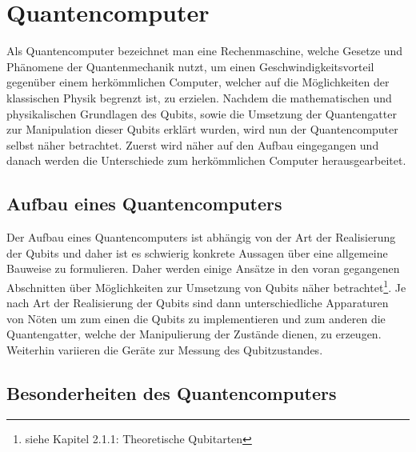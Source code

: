 \documentclass[12pt]{report}
\begin{document}
\chapter{Quantencomputer}			%

Als Quantencomputer bezeichnet man eine  Rechenmaschine, welche Gesetze und Phänomene der Quantenmechanik nutzt, um einen Geschwindigkeitsvorteil gegenüber einem herkömmlichen Computer, welcher auf die Möglichkeiten der klassischen Physik begrenzt ist, zu erzielen. \newline
Nachdem die mathematischen und physikalischen Grundlagen des Qubits, sowie die Umsetzung der Quantengatter zur Manipulation dieser Qubits erklärt wurden, wird nun der Quantencomputer selbst näher betrachtet. Zuerst wird näher auf den Aufbau eingegangen und danach werden die Unterschiede zum herkömmlichen Computer herausgearbeitet.

\section{Aufbau eines Quantencomputers}

Der Aufbau eines Quantencomputers ist abhängig von der Art der Realisierung der Qubits und daher ist es schwierig konkrete Aussagen über eine allgemeine Bauweise zu formulieren. Daher werden einige Ansätze in den voran gegangenen Abschnitten über Möglichkeiten zur Umsetzung von Qubits näher betrachtet\footnote{siehe Kapitel 2.1.1: Theoretische Qubitarten}.\newline
Je nach Art der Realisierung der Qubits sind dann unterschiedliche Apparaturen von Nöten um zum einen die Qubits zu implementieren und zum anderen die Quantengatter, welche der Manipulierung der Zustände dienen, zu erzeugen. Weiterhin variieren die Geräte zur Messung des Qubitzustandes.


\section{Besonderheiten des Quantencomputers}
\end{document}
